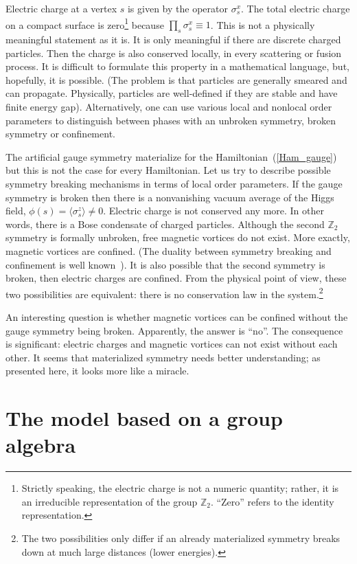 \documentclass[12pt]{article}
\newcommand{\Z}{\mathbb{Z}}
\begin{document}
Electric charge at a vertex $s$ is given by the operator $\sigma^x_s$. The 
total electric charge on a compact surface is zero\footnote{
 Strictly speaking, the electric charge is not a numeric quantity; rather, it 
 is an irreducible representation of the group $\Z_2$. ``Zero'' refers to the 
 identity representation.}
because $\prod_{s}\sigma^x_s\equiv 1$. This is not a physically meaningful 
statement as it is. It is only meaningful if there are discrete charged 
particles. Then the charge is also conserved locally, in every scattering or 
fusion process. It is difficult to formulate this property in a mathematical 
language, but, hopefully, it is possible. (The problem is that particles are 
generally smeared and can propagate. Physically, particles are well-defined 
if they are stable and have finite energy gap). Alternatively, one can use 
various local and nonlocal order parameters to distinguish 
between phases with an unbroken symmetry, broken symmetry or confinement. 

The artificial gauge symmetry materialize for the 
Hamiltonian~(\ref{Ham_gauge}) but this is not the case for every Hamiltonian.
Let us try to describe possible symmetry breaking mechanisms in terms of local 
order parameters. If the gauge symmetry is broken then there is a nonvanishing 
vacuum average of the Higgs field, $\phi(s)=\langle\sigma^z_s\rangle\not=0$. 
Electric charge is not conserved any more. In other words, there is a Bose 
condensate of charged particles. Although the second $\Z_2$ symmetry is 
formally unbroken, free magnetic vortices do not exist. More exactly, magnetic 
vortices are confined. (The duality between symmetry breaking and confinement 
is well known~\cite{Hooft}). It is also possible that the second 
symmetry is broken, then electric charges are confined. From the physical 
point of view, these two possibilities are equivalent: 
there is no conservation law in the system.\footnote{
 The two possibilities only differ if an already materialized symmetry breaks 
 down at much large distances (lower energies).}

An interesting question is whether magnetic vortices can be confined without
the gauge symmetry being broken. Apparently, the answer is ``no''. The
consequence is significant: electric charges and magnetic vortices can not
exist without each other. It seems that materialized symmetry needs better
understanding; as presented here, it looks more like a miracle.


\section{The model based on a group algebra}
\end{document}
